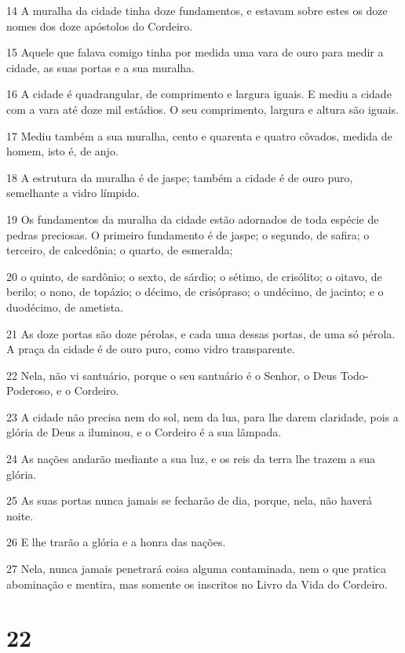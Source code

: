 \par 14 A muralha da cidade tinha doze fundamentos, e estavam sobre estes os doze nomes dos doze apóstolos do Cordeiro.
\par 15 Aquele que falava comigo tinha por medida uma vara de ouro para medir a cidade, as suas portas e a sua muralha.
\par 16 A cidade é quadrangular, de comprimento e largura iguais. E mediu a cidade com a vara até doze mil estádios. O seu comprimento, largura e altura são iguais.
\par 17 Mediu também a sua muralha, cento e quarenta e quatro côvados, medida de homem, isto é, de anjo.
\par 18 A estrutura da muralha é de jaspe; também a cidade é de ouro puro, semelhante a vidro límpido.
\par 19 Os fundamentos da muralha da cidade estão adornados de toda espécie de pedras preciosas. O primeiro fundamento é de jaspe; o segundo, de safira; o terceiro, de calcedônia; o quarto, de esmeralda;
\par 20 o quinto, de sardônio; o sexto, de sárdio; o sétimo, de crisólito; o oitavo, de berilo; o nono, de topázio; o décimo, de crisópraso; o undécimo, de jacinto; e o duodécimo, de ametista.
\par 21 As doze portas são doze pérolas, e cada uma dessas portas, de uma só pérola. A praça da cidade é de ouro puro, como vidro transparente.
\par 22 Nela, não vi santuário, porque o seu santuário é o Senhor, o Deus Todo-Poderoso, e o Cordeiro.
\par 23 A cidade não precisa nem do sol, nem da lua, para lhe darem claridade, pois a glória de Deus a iluminou, e o Cordeiro é a sua lâmpada.
\par 24 As nações andarão mediante a sua luz, e os reis da terra lhe trazem a sua glória.
\par 25 As suas portas nunca jamais se fecharão de dia, porque, nela, não haverá noite.
\par 26 E lhe trarão a glória e a honra das nações.
\par 27 Nela, nunca jamais penetrará coisa alguma contaminada, nem o que pratica abominação e mentira, mas somente os inscritos no Livro da Vida do Cordeiro.

\chapter{22}

